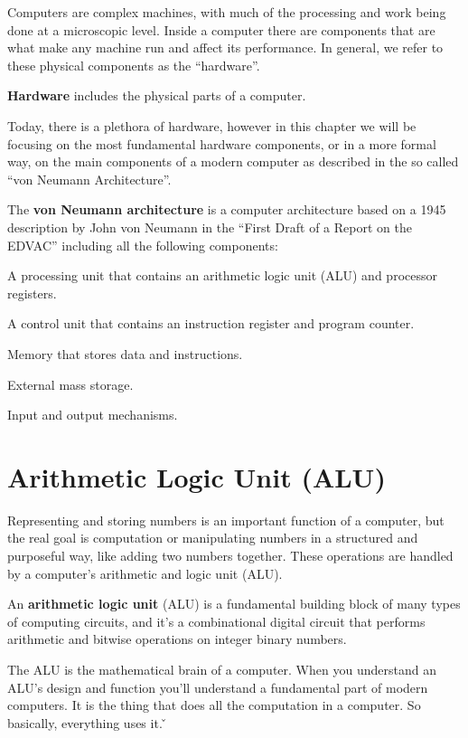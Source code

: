 Computers are complex machines, with much of the processing and work being done at a microscopic level. Inside a
computer there are components that are what make any machine run and affect its performance. In general, we refer to
these physical components as the ``hardware''.

\bd[Hardware]
\textbf{Hardware} includes the physical parts of a computer.
\ed

Today, there is a plethora of hardware, however in this chapter we will be focusing on the most fundamental hardware
components, or in a more formal way, on the main components of a modern computer as described in the so called ``von
Neumann Architecture''.

The \textbf{von Neumann architecture} is a computer architecture based on a 1945 description by John von Neumann in
the ``First Draft of a Report on the EDVAC'' including all the following components:
\bit
\item A processing unit that contains an arithmetic logic unit (ALU) and processor registers.
\item A control unit that contains an instruction register and program counter.
\item Memory that stores data and instructions.
\item External mass storage.
\item Input and output mechanisms.
\eit
\ed

\section{Arithmetic Logic Unit (ALU)}

Representing and storing numbers is an important function of a computer, but the real goal is computation or
manipulating numbers in a structured and purposeful way, like adding two numbers together. These operations are
handled by a computer's arithmetic and logic unit (ALU).

An \textbf{arithmetic logic unit} (ALU) is a fundamental building block of many types of computing circuits, and
it's a combinational digital circuit that performs arithmetic and bitwise operations on integer binary numbers.
\ed

The ALU is the mathematical brain of a computer. When you understand an ALU's design and function you'll understand a
fundamental part of modern computers. It is the thing that does all the computation in a computer. So basically,
everything uses it. \v

